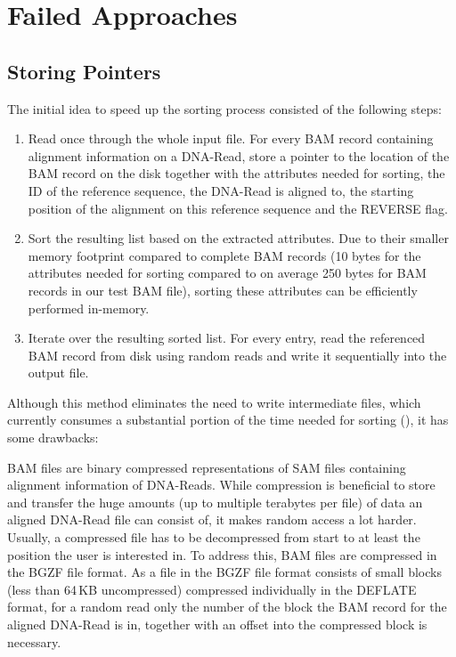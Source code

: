 \section{Failed Approaches}
\subsection{Storing Pointers}
The initial idea to speed up the sorting process consisted of the following steps: 
\begin{enumerate}
    \item Read once through the whole input file. For every BAM record containing alignment information on a DNA-Read, store a pointer to the location of the BAM record on the disk together with the attributes needed for sorting, the ID of the reference sequence, the DNA-Read is aligned to, the starting position of the alignment on this reference sequence and the REVERSE flag.
    \item Sort the resulting list based on the extracted attributes. Due to their smaller memory footprint compared to complete BAM records (10 bytes for the attributes needed for sorting compared to on average 250 bytes for BAM records in our test BAM file), sorting these attributes can be efficiently performed in-memory.
    \item Iterate over the resulting sorted list. For every entry, read the referenced BAM record from disk using random reads and write it sequentially into the output file.
\end{enumerate}

Although this method eliminates the need to write intermediate files, which currently consumes a substantial portion of the time needed for sorting (), it has some drawbacks: 

BAM files are binary compressed representations of SAM files containing alignment information of DNA-Reads. While compression is beneficial to store and transfer the huge amounts (up to multiple terabytes per file) of data an aligned DNA-Read file can consist of, it makes random access a lot harder. Usually, a compressed file has to be decompressed from start to at least the position the user is interested in. To address this, BAM files are compressed in the BGZF file format. As a file in the BGZF file format consists of small blocks (less than 64\,KB uncompressed) compressed individually in the  DEFLATE format, for a random read only the number of the block the BAM record for the aligned DNA-Read is in, together with an offset into the compressed block is necessary. 

